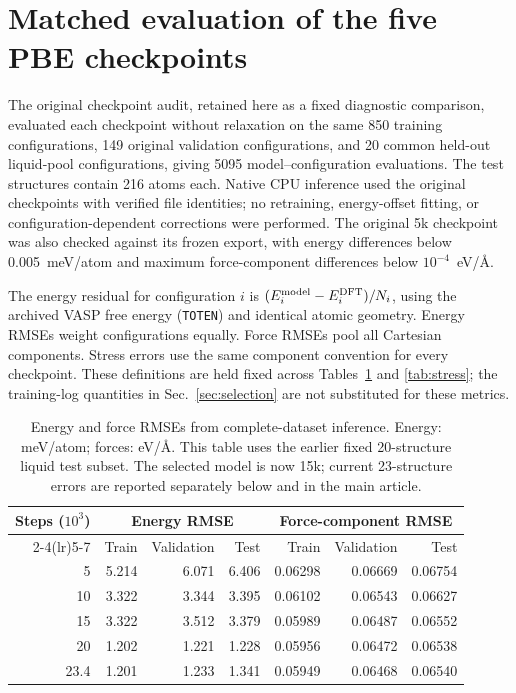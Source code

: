 \documentclass[10pt]{article}
\begin{document}
\section{Matched evaluation of the five PBE checkpoints}
\label{sec:errors}
The original checkpoint audit, retained here as a fixed diagnostic comparison, evaluated each checkpoint without relaxation on the same 850 training configurations, 149 original validation configurations, and 20 common held-out liquid-pool configurations, giving 5095 model--configuration evaluations. The test structures contain 216 atoms each. Native CPU inference used the original checkpoints with verified file identities; no retraining, energy-offset fitting, or configuration-dependent corrections were performed. The original 5k checkpoint was also checked against its frozen export, with energy differences below 0.005~meV/atom and maximum force-component differences below $10^{-4}$~eV/\AA.

The energy residual for configuration $i$ is $(E_i^{\rm model}-E_i^{\rm DFT})/N_i$, using the archived VASP free energy (\texttt{TOTEN}) and identical atomic geometry. Energy RMSEs weight configurations equally. Force RMSEs pool all Cartesian components. Stress errors use the same component convention for every checkpoint. These definitions are held fixed across Tables~\ref{tab:errors} and \ref{tab:stress}; the training-log quantities in Sec.~\ref{sec:selection} are not substituted for these metrics.

\begin{table}[htbp]
\centering
\caption{Energy and force RMSEs from complete-dataset inference. Energy: meV/atom; forces: eV/\AA. This table uses the earlier fixed 20-structure liquid test subset. The selected model is now 15k; current 23-structure errors are reported separately below and in the main article.}
\label{tab:errors}
\begin{tabular}{r rrr rrr}
\toprule
Steps ($10^3$) & \multicolumn{3}{c}{Energy RMSE} & \multicolumn{3}{c}{Force-component RMSE}\\
\cmidrule(lr){2-4}\cmidrule(lr){5-7}
 & Train & Validation & Test & Train & Validation & Test\\
\midrule
5 & 5.214 & 6.071 & 6.406 & 0.06298 & 0.06669 & 0.06754 \\
10 & 3.322 & 3.344 & 3.395 & 0.06102 & 0.06543 & 0.06627 \\
15 & 3.322 & 3.512 & 3.379 & 0.05989 & 0.06487 & 0.06552 \\
20 & 1.202 & 1.221 & 1.228 & 0.05956 & 0.06472 & 0.06538 \\
23.4 & 1.201 & 1.233 & 1.341 & 0.05949 & 0.06468 & 0.06540 \\
\bottomrule
\end{tabular}
\end{table}
\end{document}
